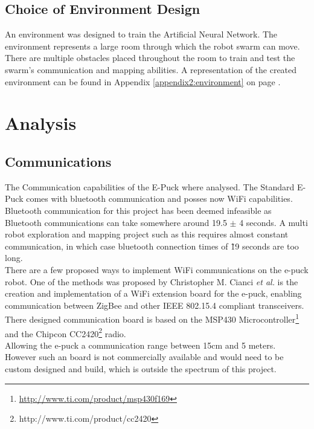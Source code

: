 \subsection{Choice of Environment Design}
An environment was designed to train the Artificial Neural Network.
The environment represents a large room through which the robot swarm can move. There are multiple obstacles placed throughout the room to train and test the swarm's communication and mapping abilities. A representation of the created environment can be found in Appendix  \ref{appendix2:environment} on page \pageref{appendix2:environment}. \\

\section{Analysis}

\subsection{Communications}
\label{chap1:communication}
The Communication capabilities of the E-Puck where analysed. The Standard E-Puck comes  with bluetooth communication and posses now WiFi capabilities. \\
Bluetooth  communication for this project has been deemed infeasible as Bluetooth communications can take somewhere around 19.5 $\pm$ 4 seconds. A multi robot exploration and mapping project such as this requires almost constant communication, in which case bluetooth connection times of \~19 seconds are too long.\\

There are a few proposed ways to implement WiFi communications on the e-puck robot. 
One of the methods was proposed by Christopher M. Cianci \textit{et al.}\cite{Cianci2007Communication} is the creation and implementation of a WiFi extension board for the e-puck, enabling communication between ZigBee and other IEEE 802.15.4 compliant transceivers. \\
There designed communication board is based on the MSP430 Microcontroller\footnote{\url{http://www.ti.com/product/msp430f169}} and the Chipcon CC2420\footnote{http://www.ti.com/product/cc2420} radio.\\
Allowing the e-puck a communication range between 15cm and 5 meters. \\
However such an board is not commercially available and would need to be custom designed and build, which is outside the spectrum of this project.

